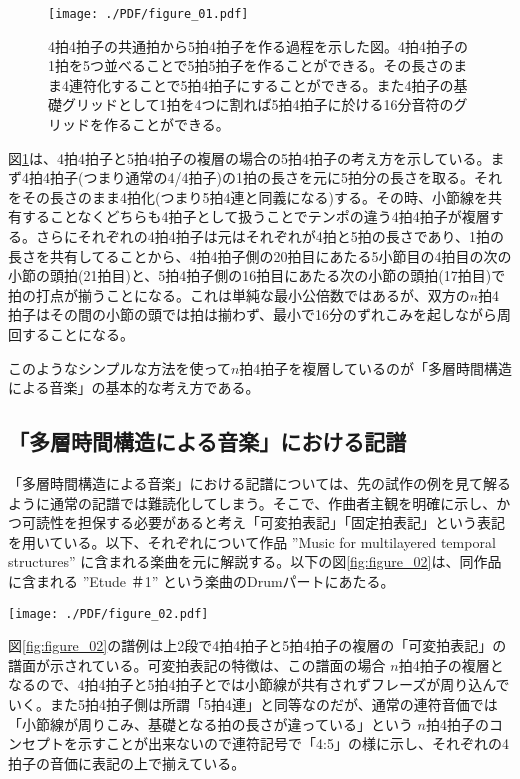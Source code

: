 \documentclass[uplatex,dvipdfmx]{ujarticle}
\begin{document}
\begin{figure}[ht]
\centerline{
	\texttt{[image: ./PDF/figure\_01.pdf]}
}
\caption{4拍4拍子の共通拍から5拍4拍子を作る過程を示した図。4拍4拍子の1拍を5つ並べることで5拍5拍子を作ることができる。その長さのまま4連符化することで5拍4拍子にすることができる。また4拍子の基礎グリッドとして1拍を4つに割れば5拍4拍子に於ける16分音符のグリッドを作ることができる。}
\label{fig:figure_01}
\end{figure}

図\ref{fig:figure_01}は、4拍4拍子と5拍4拍子の複層の場合の5拍4拍子の考え方を示している。まず4拍4拍子(つまり通常の4/4拍子)の1拍の長さを元に5拍分の長さを取る。それをその長さのまま4拍化(つまり5拍4連と同義になる)する。その時、小節線を共有することなくどちらも4拍子として扱うことでテンポの違う4拍4拍子が複層する。さらにそれぞれの4拍4拍子は元はそれぞれが4拍と5拍の長さであり、1拍の長さを共有してることから、4拍4拍子側の20拍目にあたる5小節目の4拍目の次の小節の頭拍(21拍目)と、5拍4拍子側の16拍目にあたる次の小節の頭拍(17拍目)で拍の打点が揃うことになる。これは単純な最小公倍数ではあるが、双方の$ n $拍4拍子はその間の小節の頭では拍は揃わず、最小で16分のずれこみを起しながら周回することになる。

このようなシンプルな方法を使って$ n $拍4拍子を複層しているのが「多層時間構造による音楽」の基本的な考え方である。

\subsection{「多層時間構造による音楽」における記譜}
「多層時間構造による音楽」における記譜については、先の試作の例を見て解るように通常の記譜では難読化してしまう。そこで、作曲者主観を明確に示し、かつ可読性を担保する必要があると考え「可変拍表記」「固定拍表記」という表記を用いている。以下、それぞれについて作品 ''Music for multilayered temporal structures'' に含まれる楽曲を元に解説する。以下の図\ref{fig:figure_02}は、同作品に含まれる ''Etude ＃1'' という楽曲のDrumパートにあたる。

\begin{figure*}[htb]
\centerline{
	\texttt{[image: ./PDF/figure\_02.pdf]}
}
\caption{Etude ＃1 INTRO部のDrumパート}
\label{fig:figure_02}
\end{figure*}

図\ref{fig:figure_02}の譜例は上2段で4拍4拍子と5拍4拍子の複層の「可変拍表記」の譜面が示されている。可変拍表記の特徴は、この譜面の場合 $ n $拍4拍子の複層となるので、4拍4拍子と5拍4拍子とでは小節線が共有されずフレーズが周り込んでいく。また5拍4拍子側は所謂「5拍4連」と同等なのだが、通常の連符音価では「小節線が周りこみ、基礎となる拍の長さが違っている」という $ n $拍4拍子のコンセプトを示すことが出来ないので連符記号で「4:5」の様に示し、それぞれの4拍子の音価に表記の上で揃えている。
\end{document}
